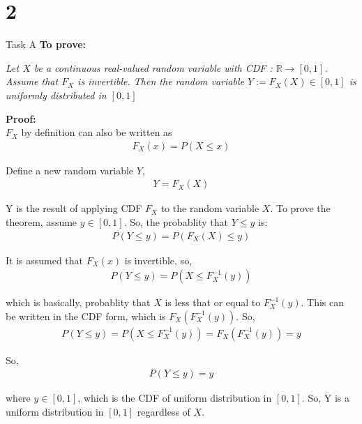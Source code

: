 \chapter{2}

\begin{task}{Task A}
	\textbf{To prove: }

	\emph{Let $X$ be a continuous real-valued random variable with CDF  :
		$\mathbb{R} \rightarrow [0, 1]$. Assume that $F_X$ is invertible. Then
		the random variable $Y := F_X (X) \in [0, 1]$ is uniformly distributed in
		$[0, 1]$}

	\textbf{Proof:}\\
	$F_X$ by definition can also be written as
	\begin{align}
		F_X(x) = P(X\leq x)
	\end{align}

	Define a new random variable $Y$,
	\begin{align}
		Y =F_X(X)
	\end{align}

	Y is the result of applying CDF $F_X$ to the random variable $X$. To
	prove the theorem, assume $y\in [0,1]$. So, the probablity that $Y \leq
		y$ is:
	\begin{align}
		P(Y\leq y) = P(F_X(X)\leq y)
	\end{align}

	It is assumed that $F_X(x)$ is invertible, so,
	\begin{align}
		P(Y\leq y) = P(X\leq F_X^{-1}(y))
	\end{align}

	which is basically, probablity that $X$ is less that or equal to
	$F_X^{-1}(y)$. This can be written in the CDF form, which is
	$F_X(F_X^{-1}(y))$. So,
	\begin{align}
		P(Y\leq y) = P(X\leq F_X^{-1}(y)) = F_X(F_X^{-1}(y)) = y
	\end{align}

	So,
	\begin{align}
		P(Y\leq y) = y
	\end{align}

	where $y\in [0,1]$, which is the CDF of uniform distribution in $[0,1]$.
	So, Y is a uniform distribution in $[0,1]$ regardless of $X$.
\end{task}

